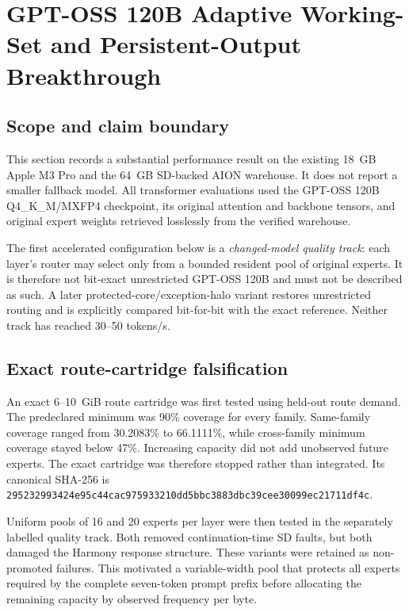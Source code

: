 \section{GPT-OSS 120B Adaptive Working-Set and Persistent-Output Breakthrough}
\label{sec:gptoss120b-adaptive-pool-20260910}

\subsection{Scope and claim boundary}

This section records a substantial performance result on the existing 18~GB
Apple M3 Pro and the 64~GB SD-backed AION warehouse.  It does not report a
smaller fallback model.  All transformer evaluations used the GPT-OSS 120B
Q4\_K\_M/MXFP4 checkpoint, its original attention and backbone tensors, and
original expert weights retrieved losslessly from the verified warehouse.

The first accelerated configuration below is a \emph{changed-model quality
track}: each layer's router may select only from a bounded resident pool of
original experts.  It is therefore not bit-exact unrestricted GPT-OSS 120B and
must not be described as such.  A later protected-core/exception-halo variant
restores unrestricted routing and is explicitly compared bit-for-bit with the
exact reference.  Neither track has reached 30--50 tokens/s.

\subsection{Exact route-cartridge falsification}

An exact 6--10~GiB route cartridge was first tested using held-out route demand.
The predeclared minimum was 90\% coverage for every family.  Same-family
coverage ranged from 30.2083\% to 66.1111\%, while cross-family minimum
coverage stayed below 47\%.  Increasing capacity did not add unobserved future
experts.  The exact cartridge was therefore stopped rather than integrated.
Its canonical SHA-256 is
\texttt{295232993424e95c44cac975933210dd5bbc3883dbc39cee30099ec21711df4c}.

Uniform pools of 16 and 20 experts per layer were then tested in the separately
labelled quality track.  Both removed continuation-time SD faults, but both
damaged the Harmony response structure.  These variants were retained as
non-promoted failures.  This motivated a variable-width pool that protects all
experts required by the complete seven-token prompt prefix before allocating
the remaining capacity by observed frequency per byte.

